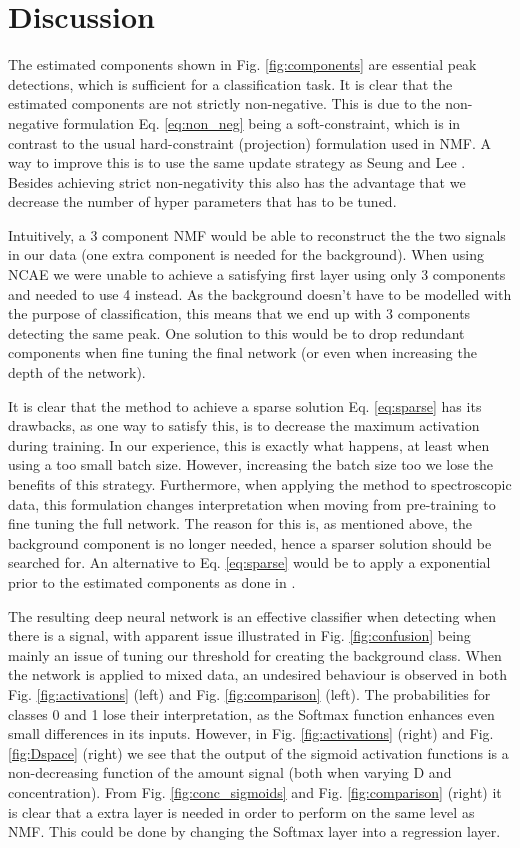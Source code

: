 \documentclass{article}
\begin{document}
\section{Discussion}
\label{sec:discussion}
The estimated components shown in Fig. \ref{fig:components} are essential peak detections, which is sufficient for a classification task. It is clear that the estimated components are not strictly non-negative. This is due to the non-negative formulation Eq. \eqref{eq:non_neg} being a soft-constraint, which is in contrast to the usual hard-constraint (projection) formulation used in NMF. A way to improve this is to use the same update strategy as Seung and Lee \cite{Seung1999}. Besides achieving strict non-negativity this also has the advantage that we decrease the number of hyper parameters that has to be tuned.

Intuitively, a 3 component NMF would be able to reconstruct the the two signals in our data (one extra component is needed for the background). When using NCAE we were unable to achieve a satisfying first layer using only 3 components and needed to use 4 instead. As the background doesn't have to be modelled with the purpose of classification, this means that we end up with 3 components detecting the same peak. One solution to this would be to drop redundant components when fine tuning the final network (or even when increasing the depth of the network).

It is clear that the method to achieve a sparse solution Eq. \eqref{eq:sparse} has its drawbacks, as one way to satisfy this, is to decrease the maximum activation during training. In our experience, this is exactly what happens, at least when using a too small batch size. However, increasing the batch size too we lose the benefits of this strategy. Furthermore, when applying the method to spectroscopic data, this formulation changes interpretation when moving from pre-training to fine tuning the full network. The reason for this is, as mentioned above, the background component is no longer needed, hence a sparser solution should be searched for. An alternative to Eq. \eqref{eq:sparse} would be to apply a exponential prior to the estimated components as done in \cite{snmf2006,ramanSNMF2014}.

The resulting deep neural network is an effective classifier when detecting when there is a signal, with apparent issue illustrated in Fig. \ref{fig:confusion} being mainly an issue of tuning our threshold for creating the background class. When the network is applied to mixed data, an undesired behaviour is observed in both Fig. \ref{fig:activations} (left) and Fig. \ref{fig:comparison} (left). The probabilities for classes 0 and 1 lose their interpretation, as the Softmax function enhances even small differences in its inputs. However, in Fig. \ref{fig:activations} (right) and Fig. \ref{fig:Dspace} (right) we see that the output of the sigmoid activation functions is a non-decreasing function of the amount signal (both when varying D and concentration). From Fig. \ref{fig:conc_sigmoids} and Fig. \ref{fig:comparison} (right) it is clear that a extra layer is needed in order to perform on the same level as NMF. This could be done by changing the Softmax layer into a regression layer.
\end{document}
